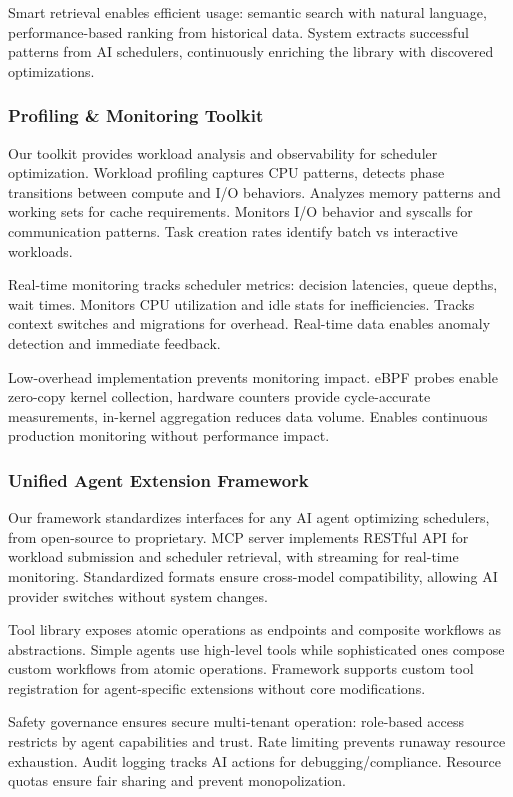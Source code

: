 Smart retrieval enables efficient usage: semantic search with natural language, performance-based ranking from historical data. System extracts successful patterns from AI schedulers, continuously enriching the library with discovered optimizations.

\subsubsection{Profiling \& Monitoring Toolkit}
Our toolkit provides workload analysis and observability for scheduler optimization. Workload profiling captures CPU patterns, detects phase transitions between compute and I/O behaviors. Analyzes memory patterns and working sets for cache requirements. Monitors I/O behavior and syscalls for communication patterns. Task creation rates identify batch vs interactive workloads.

Real-time monitoring tracks scheduler metrics: decision latencies, queue depths, wait times. Monitors CPU utilization and idle stats for inefficiencies. Tracks context switches and migrations for overhead. Real-time data enables anomaly detection and immediate feedback.

Low-overhead implementation prevents monitoring impact. eBPF probes enable zero-copy kernel collection, hardware counters provide cycle-accurate measurements, in-kernel aggregation reduces data volume. Enables continuous production monitoring without performance impact.

\subsubsection{Unified Agent Extension Framework}
Our framework standardizes interfaces for any AI agent optimizing schedulers, from open-source to proprietary. MCP server implements RESTful API for workload submission and scheduler retrieval, with streaming for real-time monitoring. Standardized formats ensure cross-model compatibility, allowing AI provider switches without system changes.

Tool library exposes atomic operations as endpoints and composite workflows as abstractions. Simple agents use high-level tools while sophisticated ones compose custom workflows from atomic operations. Framework supports custom tool registration for agent-specific extensions without core modifications.

Safety governance ensures secure multi-tenant operation: role-based access restricts by agent capabilities and trust. Rate limiting prevents runaway resource exhaustion. Audit logging tracks AI actions for debugging/compliance. Resource quotas ensure fair sharing and prevent monopolization.

